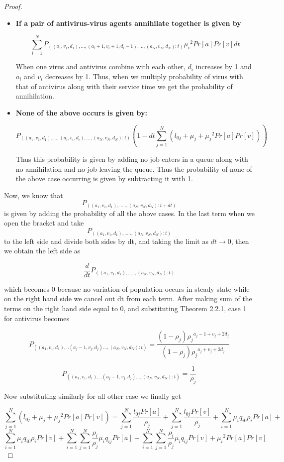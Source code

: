\begin{proof}
\begin{itemize}
\item \textbf{ If a pair of antivirus-virus agents annihilate together is given by}

$$\sum_{i=1}^{N}P_{((a_1,v_1,d_1),...,(a_{i}+1,v_{i}+1,d_{i}-1),...,(a_N,v_N,d_N):t)}{\mu_{i}}^{2}Pr[a]Pr[v]dt$$ 

When one virus and antivirus combine with each other, $d_i$ increases by 1 and $a_i$ and $v_i$ decreases by 1. Thus, when we multiply probability of virus with that of antivirus along with their service time we get the probability of annihilation.

\item \textbf{None of the above occurs is given by:}

$$P_{((a_1,v_1,d_1),...,(a_{i},v_{i},d_{i}),...,(a_N,v_N,d_N):t)}(1-dt\sum_{j=1}^{N}(l_{0j}+\mu_j+{\mu_{j}}^{2}Pr[a]Pr[v]))$$ 

Thus this probability is given by adding no job enters in a queue along with no annihilation and no job leaving the queue. Thus the probability of none of the above case occurring is given by subtracting it with 1.
	
\end{itemize}

Now, we know that $$P_{((a_1,v_1,d_1),.....,(a_N,v_N,d_N):t+dt)}$$ is given by adding the probability of all the above cases. In the last term when we open the bracket and take $$P_{((a_1,v_1,d_1),.....,(a_N,v_N,d_N):t)}$$ to the left side and divide both sides by dt, and taking the limit as $dt \to 0 $, then we obtain the left side as

$$ \frac{d}{dt}P_{((a_1,v_1,d_1),.....,(a_N,v_N,d_N):t)}  $$

which becomes 0 because no variation of population occurs in steady state while on the right hand side we cancel out dt from each term. After making sum of the terms on the right hand side equal to 0, and substituting Theorem 2.2.1, case 1 for antivirus  becomes  
	
$$P_{((a_1,v_1,d_1),..(a_{j}-1,v_j,d_j)..., (a_N,v_N,d_N):t)} =  \frac{(1-\rho_j){{\rho_j}^{a_{j}-1+v_j+2d_j}} }{(1-\rho_j){{\rho_j}^{a_{j}+v_j+2d_j}}}$$

$$P_{((a_1,v_1,d_1),..(a_{j}-1,v_j,d_j)..., (a_N,v_N,d_N):t)}= \frac{1}{\rho_j}$$

Now substituting similarly for all other case we finally get

$$\sum_{j=1}^{N}(l_{0j}+\mu_j+{\mu_{j}}^{2}Pr[a]Pr[v])=
\sum_{j=1}^{N}\frac{l_{0j}Pr[a]}{\rho_j}
+\sum_{j=1}^{N}\frac{l_{0j}Pr[v]}{\rho_j}+
\sum_{i=1}^{N}\mu_iq_{i0}\rho_iPr[a]+$$
$$\sum_{i=1}^{N}\mu_iq_{i0}\rho_iPr[v]+
\sum_{i=1}^{N}\sum_{j=1}^{N}\frac{\rho_i}{\rho_j}\mu_iq_{ij}Pr[a]+
\sum_{i=1}^{N}\sum_{j=1}^{N}\frac{\rho_i}{\rho_j}\mu_iq_{ij}Pr[v]+{\mu_{i}}^{2}Pr[a]Pr[v]$$


\end{proof}

